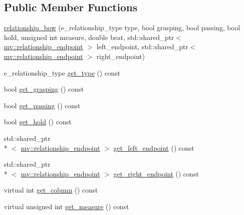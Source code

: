 \subsection*{Public Member Functions}
\begin{DoxyCompactItemize}
\item 
\hyperlink{classmae_1_1fl_1_1laban_1_1relationship__bow_af20f7988bf1736eab8bcfdbd5a12de89}{relationship\-\_\-bow} (e\-\_\-relationship\-\_\-type type, bool grasping, bool passing, bool hold, unsigned int measure, double beat, std\-::shared\-\_\-ptr$<$ \hyperlink{classmae_1_1fl_1_1laban_1_1mv_1_1relationship__endpoint}{mv\-::relationship\-\_\-endpoint} $>$ left\-\_\-endpoint, std\-::shared\-\_\-ptr$<$ \hyperlink{classmae_1_1fl_1_1laban_1_1mv_1_1relationship__endpoint}{mv\-::relationship\-\_\-endpoint} $>$ right\-\_\-endpoint)
\item 
e\-\_\-relationship\-\_\-type \hyperlink{classmae_1_1fl_1_1laban_1_1relationship__bow_a0e90506c82be0e73d94f4a013c432fd6}{get\-\_\-type} () const 
\item 
bool \hyperlink{classmae_1_1fl_1_1laban_1_1relationship__bow_ac5a514ef2bf7ae0b6e60ace972c7284c}{get\-\_\-grasping} () const 
\item 
bool \hyperlink{classmae_1_1fl_1_1laban_1_1relationship__bow_aa7916fd12af7c7f2d9b779f9e28cc97d}{get\-\_\-passing} () const 
\item 
bool \hyperlink{classmae_1_1fl_1_1laban_1_1relationship__bow_a78a0b9084fcd9003091126fd1d4c71d8}{get\-\_\-hold} () const 
\item 
std\-::shared\-\_\-ptr\\*
$<$ \hyperlink{classmae_1_1fl_1_1laban_1_1mv_1_1relationship__endpoint}{mv\-::relationship\-\_\-endpoint} $>$ \hyperlink{classmae_1_1fl_1_1laban_1_1relationship__bow_afd04183064710e48c50827955aef6336}{get\-\_\-left\-\_\-endpoint} () const 
\item 
std\-::shared\-\_\-ptr\\*
$<$ \hyperlink{classmae_1_1fl_1_1laban_1_1mv_1_1relationship__endpoint}{mv\-::relationship\-\_\-endpoint} $>$ \hyperlink{classmae_1_1fl_1_1laban_1_1relationship__bow_a40002c47a5b9a58005d84f19ff856921}{get\-\_\-right\-\_\-endpoint} () const 
\item 
virtual int \hyperlink{classmae_1_1fl_1_1laban_1_1relationship__bow_ada0c5d5f50bb062ba2c4a5afae33d76a}{get\-\_\-column} () const 
\item 
virtual unsigned int \hyperlink{classmae_1_1fl_1_1laban_1_1relationship__bow_af30dd493c707abfdf042a1ffe9e6d289}{get\-\_\-measure} () const 

\end{DoxyCompactItemize}
